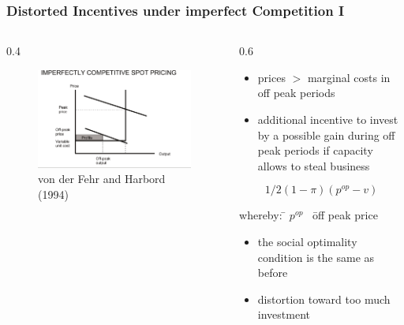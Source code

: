 							\begin{frame}

\frametitle{Distorted Incentives under imperfect Competition I}
\begin{columns}
\begin{column} {0.4\textwidth}

\begin{figure}[h]
\centering
\includegraphics[width=1.\textwidth]{capacity/peak_load_toohigh}
    \caption{von der Fehr and Harbord (1994)}
    \label{fig:Daten 2004}            
\end{figure}
\end{column}

\begin{column} {0.6\textwidth}
\begin{itemize}
\item prices $>$ marginal costs in off peak periods 
\item additional incentive to invest by a possible gain during off peak periods if capacity allows to steal business
\end {itemize}
  
\begin{equation}
	1/2 (1-\pi) (p^{op}-v)
\end{equation} 
{\small
\begin{tabbing}
whereby: \= $p^{op}$ \  \= off peak price
\end{tabbing}}

\begin{itemize}
\item the social optimality condition is the same as before
\item distortion toward too much investment
\end {itemize}

\end{column}
\end{columns}
	

							\end{frame}
